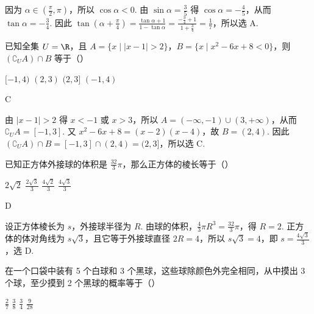 \begin{solution}
因为 \(\alpha\in\left(\frac{\pi}{2},\pi\right)\)，所以 \(\cos\alpha<0\). 由 \(\sin\alpha=\frac{3}{5}\) 得 \(\cos\alpha=-\frac{4}{5}\)，从而 \(\tan\alpha=-\frac{3}{4}\). 因此 \(\tan\left(\alpha+\frac{\pi}{4}\right)=\frac{\tan\alpha+1}{1-\tan\alpha}=\frac{-\frac{3}{4}+1}{1+\frac{3}{4}}=\frac{1}{7}\)，所以选 A.
\end{solution}

\begin{problem}
已知全集 \(U = \R\)，且 \(A = \{x \mid |x - 1| > 2\}\)，\(B = \{x \mid x^2 - 6x + 8 < 0\}\)，则 \((\complement_U A) \cap B\) 等于（\quad）

\choices
    {\([-1, 4)\)}
    {\((2,3)\)}
    {\((2,3]\)}
    {\((-1,4)\)}
\end{problem}

\begin{answer}
C
\end{answer}

\begin{solution}
由 \(|x-1|>2\) 得 \(x<-1\) 或 \(x>3\)，所以 \(A=(-\infty,-1)\cup(3,+\infty)\)，从而 \(\complement_UA=[-1,3]\). 又 \(x^2-6x+8=(x-2)(x-4)\)，故 \(B=(2,4)\). 因此 \((\complement_UA)\cap B=[-1,3]\cap(2,4)=(2,3]\)，所以选 C.
\end{solution}

\begin{problem}
已知正方体外接球的体积是 \(\frac{32}{3}\pi\)，那么正方体的棱长等于（\quad）

\choices
    {\(2\sqrt{2}\)}
    {\( \frac{2\sqrt{3}}{3} \)}
    {\( \frac{4\sqrt{2}}{3} \)}
    {\( \frac{4\sqrt{3}}{3} \)}
\end{problem}

\begin{answer}
D
\end{answer}

\begin{solution}
设正方体棱长为 \(s\)，外接球半径为 \(R\). 由球的体积，\(\frac{4}{3}\pi R^3=\frac{32}{3}\pi\)，得 \(R=2\). 正方体的体对角线为 \(s\sqrt{3}\)，且它等于外接球直径 \(2R=4\)，所以 \(s\sqrt{3}=4\)，即 \(s=\frac{4\sqrt{3}}{3}\)，选 D.
\end{solution}

\begin{problem}
在一个口袋中装有 5 个白球和 3 个黑球，这些球除颜色外完全相同，从中摸出 3 个球，至少摸到 2 个黑球的概率等于（\quad）

\choices
    {\(\frac{2}{7}\)}
    {\(\frac{3}{8}\)}
    {\(\frac{3}{4}\)}
    {\(\frac{9}{28}\)}
\end{problem}

